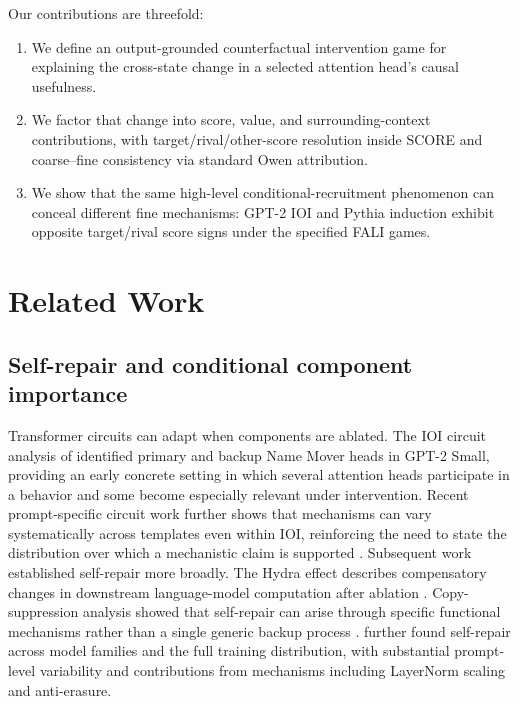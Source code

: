 \documentclass[pdflatex,sn-mathphys-ay]{sn-jnl}
\begin{document}
Our contributions are threefold:
\begin{enumerate}
    \item We define an output-grounded counterfactual intervention game for explaining the cross-state change in a selected attention head's causal usefulness.
    \item We factor that change into score, value, and surrounding-context contributions, with target/rival/other-score resolution inside SCORE and coarse--fine consistency via standard Owen attribution.
    \item We show that the same high-level conditional-recruitment phenomenon can conceal different fine mechanisms: GPT-2 IOI and Pythia induction exhibit opposite target/rival score signs under the specified FALI games.
\end{enumerate}

\section{Related Work}\label{sec:related}

\subsection{Self-repair and conditional component importance}\label{sec:rw-conditional}

Transformer circuits can adapt when components are ablated. The IOI circuit analysis of \citet{wang2023ioi} identified primary and backup Name Mover heads in GPT-2 Small, providing an early concrete setting in which several attention heads participate in a behavior and some become especially relevant under intervention. Recent prompt-specific circuit work further shows that mechanisms can vary systematically across templates even within IOI, reinforcing the need to state the distribution over which a mechanistic claim is supported \citep{franco2026promptspecific}. Subsequent work established self-repair more broadly. The Hydra effect describes compensatory changes in downstream language-model computation after ablation \citep{mcgrath2023hydra}. Copy-suppression analysis showed that self-repair can arise through specific functional mechanisms rather than a single generic backup process \citep{mcdougall2023copysuppression}. \citet{rushing2024selfrepair} further found self-repair across model families and the full training distribution, with substantial prompt-level variability and contributions from mechanisms including LayerNorm scaling and anti-erasure.
\end{document}
